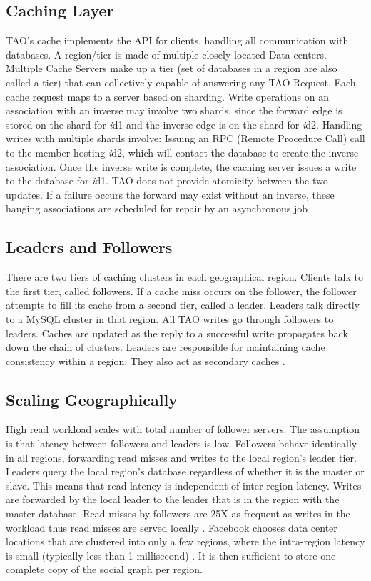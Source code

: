 \documentclass[9pt,twocolumn,twoside]{../../styles/osajnl}
\begin{document}
\subsection{Caching Layer}
TAO’s cache implements the API for clients, handling all communication with databases. A region/tier is made of multiple closely located Data centers. Multiple Cache Servers make up a tier (set of databases in a region are also called a tier) that can collectively capable of answering any TAO Request. Each cache request maps to a server based on sharding. Write operations on an association with an inverse may involve two shards, since the forward edge is stored on the shard for \emph id1 and the inverse edge is on the shard for \emph id2. Handling writes with multiple shards involve: Issuing an RPC (Remote Procedure Call) call to the member hosting \emph id2, which will contact the database to create the inverse association. Once the inverse write is complete, the caching server issues a write to the database for \emph id1. TAO does not provide atomicity between the two updates. If a failure occurs the forward may exist without an inverse, these hanging associations are scheduled for repair by an asynchronous job \cite{www-tao4}.

\subsection {Leaders and Followers}
There are two tiers of caching clusters in each geographical region. Clients talk to the first tier, called followers. If a cache miss occurs on the follower, the follower attempts to fill its cache from a second tier, called a leader. Leaders talk directly to a MySQL cluster in that region. All TAO writes go through followers to leaders. Caches are updated as the reply to a successful write propagates back down the chain of clusters. Leaders are responsible for maintaining cache consistency within a region. They also act as secondary caches \cite{www-tao2}.

\subsection {Scaling Geographically}
High read workload scales with total number of follower servers. The assumption is that latency between followers and leaders is low. Followers behave identically in all regions, forwarding read misses and writes to the local region’s leader tier. Leaders query the local region’s database regardless of whether it is the master or slave. This means that read latency is independent of inter-region latency. Writes are forwarded by the local leader to the leader that is in the region with the master database. Read misses by followers are 25X as frequent as writes in the workload thus read misses are served locally \cite{www-tao4}. Facebook chooses data center locations that are clustered into only a few regions, where the intra-region latency is small (typically less than 1 millisecond) \cite{www-tao4}. It is then sufficient to store one complete copy of the social graph per region.
\end{document}
